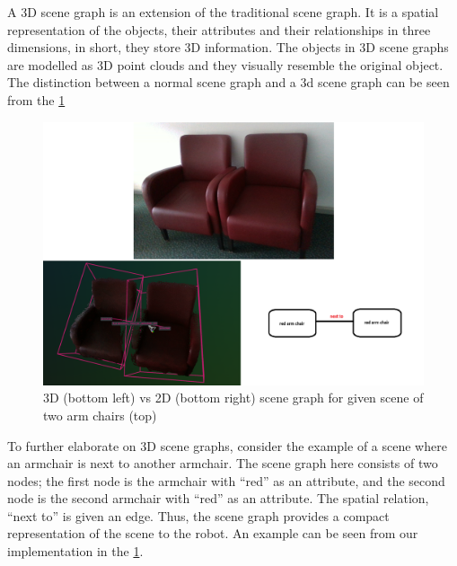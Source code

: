 A 3D scene graph is an extension of the traditional scene graph. It is a spatial representation of the objects, their attributes 
and their relationships in three dimensions, in short, they store 3D information. The objects in 3D scene graphs are modelled as
 3D point clouds and they visually resemble the original object. The distinction between a normal scene graph and a 3d scene graph 
 can be seen from the \cref{fig:2dvs3dSG}
 \begin{figure}[ht!]
    \centering
    \includegraphics[width=\textwidth]{content/images/2dvs3dSG.png}
    \caption{3D (bottom left) vs 2D (bottom right) scene graph for given scene of two arm chairs (top)}
    \label{fig:2dvs3dSG}
\end{figure}
To further elaborate on 3D scene graphs, consider the example of a scene where an armchair is next to another armchair.
The scene graph here consists of two nodes;
the first node is the armchair with \enquote{red} as an attribute, and the second node is the second armchair with \enquote{red} as an attribute. The spatial relation, 
\enquote{next to} is given an edge. Thus, the scene graph provides a compact representation of the scene to the robot. 
An example can be seen from our implementation in the \cref{fig:2dvs3dSG}.

